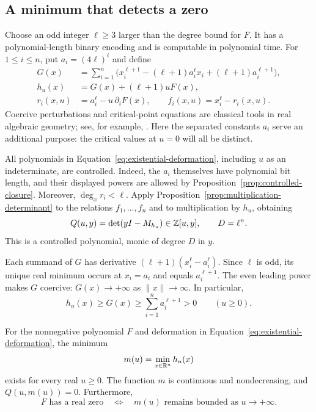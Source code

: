 \subsection{A minimum that detects a zero}

Choose an odd integer $\ell\ge3$ larger than the degree bound for $F$.
It has a polynomial-length binary encoding and is computable in
polynomial time.  For $1\le i\le n$, put $a_i=(4\ell)^i$ and define
\begin{equation}\label{eq:existential-deformation}
 \begin{split}
 G(x)&=\sum_{i=1}^n
   \bigl(x_i^{\ell+1}-(\ell+1)a_i^\ell x_i
                    +(\ell+1)a_i^{\ell+1}\bigr),\\
 h_u(x)&=G(x)+(\ell+1)uF(x),\\
 r_i(x,u)&=a_i^\ell-u\,\partial_iF(x),\qquad
 f_i(x,u)=x_i^\ell-r_i(x,u).
 \end{split}
\end{equation}
Coercive perturbations and critical-point equations are classical tools
in real algebraic geometry; see, for example,
\citet{BasuPollackRoy2006}.  Here the separated constants $a_i$ serve an
additional purpose: the critical values at $u=0$ will all be distinct.

All polynomials in Equation~\eqref{eq:existential-deformation}, including
$u$ as an indeterminate, are controlled.  Indeed, the $a_i$ themselves
have polynomial bit length, and their displayed powers are allowed by
Proposition~\ref{prop:controlled-closure}.  Moreover,
$\deg_x r_i<\ell$.  Apply
Proposition~\ref{prop:multiplication-determinant} to the relations
$f_1,\ldots,f_n$ and to multiplication by $h_u$, obtaining
\begin{equation}\label{eq:existential-characteristic}
 Q(u,y)=\det(yI-M_{h_u})\in\mathbb Z[u,y],
 \qquad D=\ell^n.
\end{equation}
This is a controlled polynomial, monic of degree $D$ in $y$.

Each summand of $G$ has derivative
$(\ell+1)(x_i^\ell-a_i^\ell)$.  Since $\ell$ is odd, its unique real
minimum occurs at $x_i=a_i$ and equals $a_i^{\ell+1}$.  The even leading
power makes $G$ coercive: $G(x)\to+\infty$ as
$\lVert x\rVert\to\infty$.  In particular,
\begin{equation}\label{eq:existential-coercivity}
 h_u(x)\ge G(x)\ge\sum_{i=1}^n a_i^{\ell+1}>0
 \qquad(u\ge0).
\end{equation}

\begin{lemma}\label{lem:bounded-minimum}
For the nonnegative polynomial $F$ and deformation in
Equation~\eqref{eq:existential-deformation}, the minimum
\[
 m(u)=\min_{x\in\mathbb R^n}h_u(x)
\]
exists for every real $u\ge0$.  The function $m$ is continuous and
nondecreasing, and $Q(u,m(u))=0$.  Furthermore,
\[
 F\text{ has a real zero}
 \quad\Longleftrightarrow\quad
 m(u)\text{ remains bounded as }u\to+\infty.
\]
\end{lemma}

